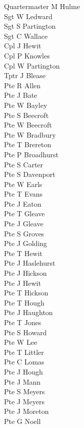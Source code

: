 \begin{multicols}{3}
  \small
  \noindent
  Quartermaster M Hulme \\
  Sgt W Ledward \\
  Sgt S Partington \\
  Sgt C Wallace \\
  Cpl J Hewit \\
  Cpl P Knowles \\
  Cpl W Partington \\
  Tptr J Blease \\
  Pte R Allen \\
  Pte J Bate \\
  Pte W Bayley \\
  Pte S Beecroft \\
  Pte W Beecroft \\
  Pte W Bradbury \\
  Pte T Brereton \\
  Pte P Broadhurst \\
  Pte S Carter \\
  Pte S Davenport \\
  Pte W Earls \\
  Pte T Evans \\
  Pte J Eaton \\
  Pte T Gleave \\
  Pte J Gleave \\
  Pte S Groves \\
  Pte J Golding \\
  Pte T Hewit \\
  Pte J Haslehurst \\
  Pte J Hickson \\
  Pte J Hewit \\
  Pte T Hickson \\
  Pte T Hough \\
  Pte J Haughton \\
  Pte T Jones \\
  Pte S Howard \\
  Pte W Lee \\
  Pte T Littler \\
  Pte C Lomas \\
  Pte J Hough \\
  Pte J Mann \\
  Pte S Meyers \\
  Pte J Meyers \\
  Pte J Moreton \\
  Pte G Noell \\

\end{multicols}
